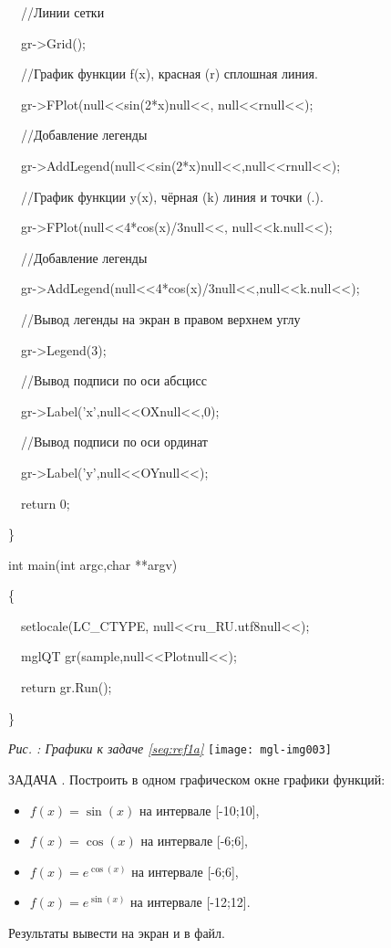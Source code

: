 {\upshape
\ \ //Линии сетки}

\ \ gr-{\textgreater}Grid();

\ \ //График функции f(x), красная (r) сплошная линия.

\ \ gr-{\textgreater}FPlot(null{<<}sin(2*x)null{<<}, null{<<}rnull{<<});

\ \ //Добавление легенды

\ \ gr-{\textgreater}AddLegend(null{<<}sin(2*x)null{<<},null{<<}rnull{<<});

{\upshape
\ \ //График функции y(x), чёрная (k) линия и точки (.).}

\ \ gr-{\textgreater}FPlot(null{<<}4*cos(x)/3null{<<}, null{<<}k.null{<<});

\ \ //Добавление легенды

\ \ gr-{\textgreater}AddLegend(null{<<}4*cos(x)/3null{<<},null{<<}k.null{<<});

{\upshape
\ \ //Вывод легенды на экран в правом верхнем углу}

\ \ gr-{\textgreater}Legend(3);

{\upshape
\ \ //Вывод подписи по оси абсцисс}

\ \ gr-{\textgreater}Label('x',null{<<}OXnull{<<},0);

{\upshape
\ \ //Вывод подписи по оси ординат}

\ \ gr-{\textgreater}Label('y',null{<<}OYnull{<<});

\ \ return 0;

\}

int main(int argc,char **argv)

\{

\ \ setlocale(LC\_CTYPE, null{<<}ru\_RU.utf8null{<<});

\ \ mglQT gr(sample,null{<<}Plotnull{<<});

\ \ return gr.Run();

\}

{\centering \begin{minipage}{13.113cm}
{\itshape
Рис. {\theqwertya\label{seq:ref2}}: Графики к задаче \ref{seq:ref1a}}
\texttt{[image: mgl-img003]}\end{minipage}\par}

ЗАДАЧА . Построить в одном графическом окне графики функций:

\begin{itemize}
\item  $f(x)=\sin (x)$ на интервале [-10;10], 
\item  $f(x)=\cos (x)$ на интервале [-6;6], 
\item  $f(x)=e^{\cos (x)}$ на интервале [-6;6],
\item  $f(x)=e^{\sin (x)}$ на интервале [-12;12].
\end{itemize}
Результаты вывести на экран и в файл.

